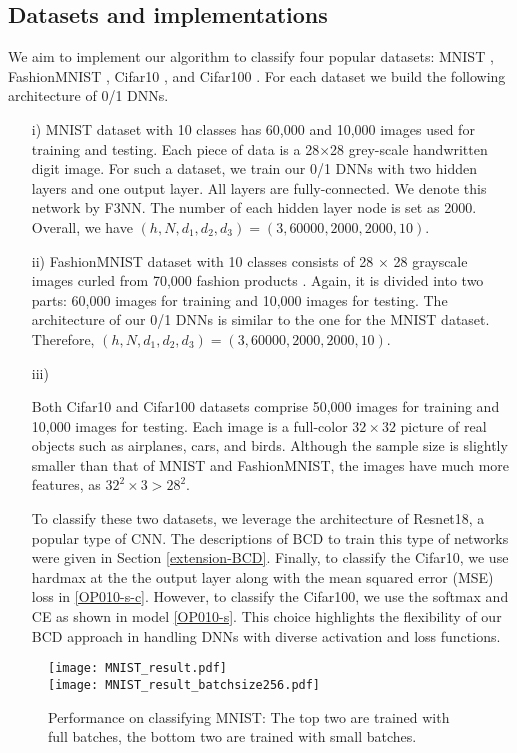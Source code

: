 \documentclass[journal]{IEEEtran}
\begin{document}
\subsection{Datasets and implementations}
We aim to implement our algorithm to classify four popular datasets: MNIST \cite{LeCun2010}, FashionMNIST \cite{Xiao2017}, { Cifar10 \cite{Krizhevsky-Nair2014}, and Cifar100 \cite{Krizhevsky-Nair2014}}. For each dataset we build the following architecture of 0/1 DNNs.

\begin{itemize}[leftmargin=15pt]
\item[i)] MNIST dataset with 10 classes has 60,000 and 10,000 images used for training and testing. Each piece of data is a 28$\times$28 grey-scale handwritten digit image. For such a dataset, we train our 0/1 DNNs with two hidden layers and one  output layer. {All layers are fully-connected. We denote this network by F3NN.} The number of each hidden layer node is set as 2000. Overall, we have $(h, N, d_1,d_2,d_3)=(3, 60000, 2000, 2000, 10)$.

\item[ii)] FashionMNIST dataset with 10 classes consists of 28 $\times$ 28 grayscale images curled from 70,000 fashion products \cite{Xiao2017}. Again, it is divided into two parts: 60,000 images for training and 10,000 images for testing. The architecture of our 0/1 DNNs is similar to the one for the MNIST dataset. Therefore,  $(h, N, d_1,d_2,d_3)=(3, 60000, 2000, 2000, 10)$.

\item[iii)] { Both Cifar10  and Cifar100 datasets comprise 50,000 images for training and 10,000 images for testing. Each image is a full-color $32\times32$ picture of real objects such as airplanes, cars, and birds. Although the sample size is slightly smaller than that of MNIST and FashionMNIST,  the images have much more features, as $32^2\times3 > 28^2$.

To classify these two datasets, we leverage the architecture of Resnet18, a popular type of CNN.  The descriptions of BCD to train this type of networks were given in Section \ref{extension-BCD}.  Finally, to classify the Cifar10, we use hardmax at the the output layer along with the mean squared error (MSE) loss in \eqref{OP010-s-c}. However, to classify the Cifar100, we use the softmax and CE as shown in model \eqref{OP010-s}. This choice highlights the flexibility of our BCD approach in handling DNNs with diverse activation and loss functions.}
\end{itemize}
\begin{figure*}[!th]
\centering
\texttt{[image: MNIST\_result.pdf]}\\  \vspace{1mm}
\texttt{[image: MNIST\_result\_batchsize256.pdf]}\\  
\caption{Performance on classifying MNIST: The top two are trained with full batches, the bottom two are trained with small batches.}
\label{fig:MNIST} 
\end{figure*}
\end{document}
